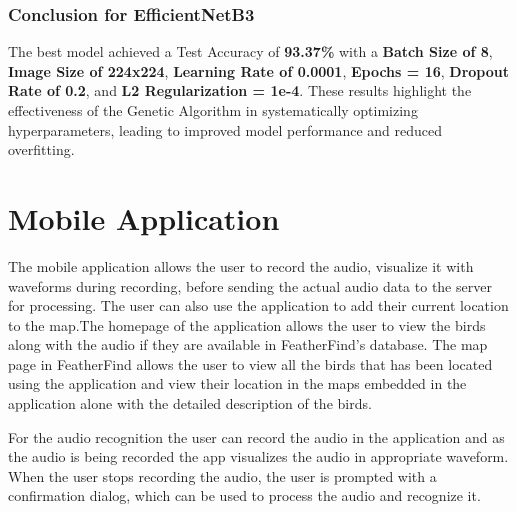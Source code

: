   
  
\subsubsection{Conclusion for EfficientNetB3}
The best model achieved a Test Accuracy of \textbf{93.37\%} with a \textbf{Batch Size of 8}, \textbf{Image Size of 224x224}, \textbf{Learning Rate of 0.0001}, \textbf{Epochs = 16}, \textbf{Dropout Rate of 0.2}, and \textbf{L2 Regularization = 1e-4}. These results highlight the effectiveness of the Genetic Algorithm in systematically optimizing hyperparameters, leading to improved model performance and reduced overfitting.

\section{Mobile Application}
The mobile application allows the user to record the audio, visualize it with
waveforms during recording, before sending the actual audio data to the server
for processing. The user can also use the application to add their current
location to the map.The homepage of the application allows the user to view the birds along with 
the audio if they are available in FeatherFind's database.
The map page in FeatherFind allows the user to view all the birds that has been located
using the application and view their location in the maps embedded in the application alone 
with the detailed description of the birds.

For the audio recognition the user can record the audio in the application and as the 
audio is being recorded the app visualizes the audio in appropriate waveform. When the user stops
recording the audio, the user is prompted with a confirmation dialog, which can be used to process the 
audio and recognize it.

